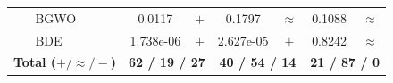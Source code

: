 \begin{table}[htbp]
\begin{tabular*}{\textwidth}{@{\extracolsep{\fill}}llcccccc@{}}
                       & BGWO  &    0.0117 & $+$ &    0.1797 & $\approx$ &    0.1088 & $\approx$ \\
                       & BDE   & 1.738e-06 & $+$ & 2.627e-05 & $+$ &    0.8242 & $\approx$ \\
    \midrule
    \multicolumn{2}{l}{\textbf{Total ($+ / \approx / -$)}} & \multicolumn{2}{c}{\textbf{62 / 19 / 27}}  & \multicolumn{2}{c}{\textbf{40 / 54 / 14}}  & \multicolumn{2}{c}{\textbf{21 / 87 / 0}} \\
    \bottomrule
  \end{tabular*}
  \vspace{1ex}
\end{table}
